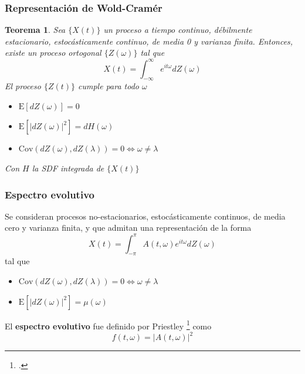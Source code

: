 \documentclass[serif,mathserif,professionalfont]{beamer}
\newtheorem{teorema}{Teorema}
\newcommand{\intR}{\int_{-\infty}^{\infty}}
\newcommand{\intPI}{\int_{-\pi}^{\pi}}
\newcommand{\E}[1]{\mathrm{E}\left[ #1 \right]}
\newcommand{\Cov}[1]{\mathrm{Cov}\left( #1 \right)}
\newcommand{\abso}[1]{\left| #1 \right|}
\begin{document}
\begin{frame}\frametitle{Representaci\'on de Wold-Cram\'er}
\begin{teorema}
Sea $\{X(t)\}$ un proceso a tiempo continuo, d\'ebilmente estacionario, estoc\'asticamente 
continuo, de media 0 y varianza finita. Entonces, existe un proceso ortogonal $\{Z(\omega)\}$ tal 
que
\begin{equation*}
X(t) = \intR e^{i t \omega} dZ(\omega)
\end{equation*}
El proceso $\{Z(t)\}$ cumple para todo $\omega$
\begin{itemize}
\item $\E{dZ(\omega)} = 0$
\item $\E{\abso{dZ(\omega)}^{2}} = dH(\omega)$
\item $\Cov{dZ(\omega),dZ(\lambda)} = 0 \Leftrightarrow \omega \neq \lambda$
\end{itemize}
Con $H$ la SDF integrada de $\{X(t)\}$
\end{teorema}
\end{frame}

\begin{frame}\frametitle{Espectro evolutivo}
Se consideran procesos no-estacionarios, estoc\'asticamente continuos, de media cero y varianza 
finita, y que admitan una representaci\'on de la forma
\begin{equation*}
X(t) = \intPI A(t,\omega) e^{i t \omega} dZ(\omega)
\end{equation*}
tal que 
\begin{itemize}
\item $\Cov{dZ(\omega),dZ(\lambda)} = 0 \Leftrightarrow \omega \neq \lambda$
\item $\E{\abso{dZ(\omega)}^{2}} = \mu(\omega)$
\end{itemize}

El \textbf{espectro evolutivo} fue definido por Priestley \footcite{Priestley65} como
\begin{equation*}
f(t,\omega) = \abso{A(t,\omega)}^{2}
\end{equation*}
\end{frame}

\end{document}
